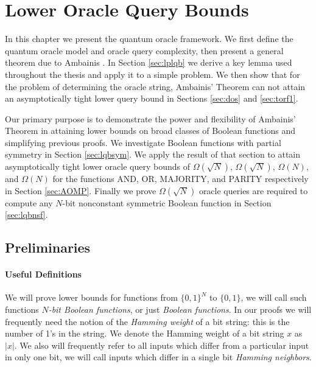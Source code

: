\newtheorem{theorem}{Theorem}[section]
\newtheorem{lemma}{Lemma}[section]
\newtheorem{defi}{Definition}[section]
\newtheorem{corollary}{Corollary}[section]

\chapter{Lower Oracle Query Bounds}
\label{ch:oracle}

In this chapter we present the quantum oracle framework.  We first
define the quantum oracle model and oracle query complexity, then
present a general theorem due to Ambainis \cite{ambainis00quantum}.
In Section \ref{sec:lplqb} we derive a key lemma used throughout the
thesis and apply it to a simple problem.  We then show that for the
problem of determining the oracle string, Ambainis' Theorem can not
attain an asymptotically tight lower query bound in Sections
\ref{sec:dos} and \ref{sec:torf1}.

Our primary purpose is to demonstrate the power and flexibility of
Ambainis' Theorem in attaining lower bounds on broad classes of
Boolean functions and simplifying previous proofs.  We investigate
Boolean functions with partial symmetry in Section \ref{sec:lqbsym}.
We apply the result of that section to attain asymptotically tight
lower oracle query bounds of $\Omega(\sqrt{N})$, $\Omega(\sqrt{N})$,
$\Omega(N)$, and $\Omega(N)$ for the functions AND, OR, MAJORITY, and
PARITY respectively in Section
\ref{sec:AOMP}.  Finally we prove $\Omega(\sqrt{N})$ oracle
queries are required to compute any $N$-bit nonconstant symmetric
Boolean function in Section \ref{sec:lqbnsf}.

\section{Preliminaries}

\subsubsection{Useful Definitions}

We will prove lower bounds for functions from $\{0,1\}^{N}$ to
$\{0,1\}$, we will call such functions \emph{$N$-bit Boolean
functions}, or just \emph{Boolean functions}.  In our proofs we will
frequently need the notion of the \emph{Hamming weight} of a bit
string: this is the number of 1's in the string.  We denote the
Hamming weight of a bit string $x$ as $|x|$.  We also will frequently
refer to all inputs which differ from a particular input in only one
bit, we will call inputs which differ in a single bit \emph{Hamming
neighbors}.


